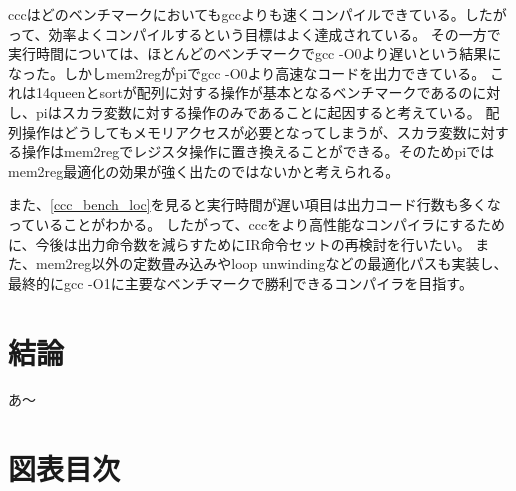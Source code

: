 \documentclass[uplatex,a4paper]{jsarticle}
\begin{document}
cccはどのベンチマークにおいてもgccよりも速くコンパイルできている。したがって、効率よくコンパイルするという目標はよく達成されている。
その一方で実行時間については、ほとんどのベンチマークでgcc -O0より遅いという結果になった。しかしmem2regがpiでgcc -O0より高速なコードを出力できている。
これは14queenとsortが配列に対する操作が基本となるベンチマークであるのに対し、piはスカラ変数に対する操作のみであることに起因すると考えている。
配列操作はどうしてもメモリアクセスが必要となってしまうが、スカラ変数に対する操作はmem2regでレジスタ操作に置き換えることができる。そのためpiではmem2reg最適化の効果が強く出たのではないかと考えられる。

また、\cref{ccc_bench_loc}を見ると実行時間が遅い項目は出力コード行数も多くなっていることがわかる。
したがって、cccをより高性能なコンパイラにするために、今後は出力命令数を減らすためにIR命令セットの再検討を行いたい。
また、mem2reg以外の定数畳み込みやloop unwindingなどの最適化パスも実装し、最終的にgcc -O1に主要なベンチマークで勝利できるコンパイラを目指す。

\section{結論}

あ〜

\clearpage
\appendix

\section{図表目次}
\listoffigures
\listofalgorithms
\listoftables



\end{document}
